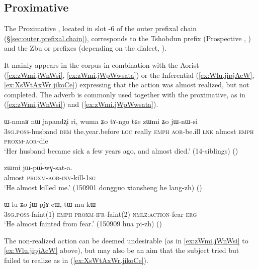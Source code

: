 \subsection{Proximative} \label{sec:proximative}
The Proximative , located in slot -6 of the outer prefixal chain (§\ref{sec:outer.prefixal.chain}), corresponds to the Tshobdun  prefix (Prospective , \citealt[142–143]{sun08shiti}) and the Zbu  or  prefixes (depending on the dialect, \citealt[9;201-202]{gong18these}).

It mainly appears in the corpus in combination with the Aorist (\ref{ex:zWmi.jWnWsi}, \ref{ex:zWmi.jWpWwsata}) or the Inferential (\ref{ex:Wlu.jipjAcW}, \ref{ex:XsWtAxWr.jikoCe}) expressing that the action was almost realized, but not completed. The adverb  is commonly used together with the proximative, as in (\ref{ex:zWmi.jWnWsi}) and (\ref{ex:zWmi.jWpWwsata}).

\begin{exe}
\ex \label{ex:zWmi.jWnWsi}
\gll ɯ-nmaʁ nɯ japandʐi ri, wuma ʑo tɤ-ngo tɕe zɯmi ʑo jɯ-nɯ-si \\
\textsc{3sg}.\textsc{poss}-husband \textsc{dem} the.year.before \textsc{loc} really \textsc{emph} \textsc{aor}-be.ill \textsc{lnk} almost \textsc{emph}  \textsc{proxm}-\textsc{aor}-die \\
\glt `Her husband became sick a few years ago, and almost died.' (14-siblings)
()
  \end{exe}
  
  \begin{exe}
\ex \label{ex:zWmi.jWpWwsata}
\gll zɯmi jɯ-pɯ́-wɣ-sat-a. \\
almost \textsc{proxm}-\textsc{aor}-\textsc{inv}-kill-\textsc{1sg} \\
\glt `He almost killed me.' (150901 dongguo xiansheng he lang-zh) ()
 \end{exe} 
 
\begin{exe}
\ex \label{ex:Wlu.jipjAcW}
\gll ɯ-lu ʑo jɯ-pjɤ-cɯ, tɯ-mu kɯ \\
\textsc{3sg}.\textsc{poss}-faint(1) \textsc{emph} \textsc{proxm}-\textsc{ifr}-faint(2) \textsc{nmlz}:\textsc{action}-fear \textsc{erg} \\
\glt `He almost fainted from fear.' (150909 hua pi-zh) ()
\end{exe}

The non-realized action can be deemed undesirable (as in \ref{ex:zWmi.jWnWsi} to \ref{ex:Wlu.jipjAcW} above), but may also be an aim that the subject tried but failed to realize as in (\ref{ex:XsWtAxWr.jikoCe}).

